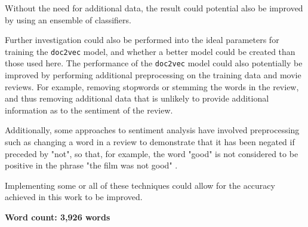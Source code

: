 \documentclass[twocolumn]{article}
\begin{document}
Without the need for additional data, the result could potential also be improved by using an ensemble of classifiers.

Further investigation could also be performed into the ideal parameters for training the \texttt{doc2vec} model, and whether a better model could be created than those used here. The performance of the \texttt{doc2vec} model could also potentially be improved by performing additional preprocessing on the training data and movie reviews. For example, removing stopwords or stemming the words in the review, and thus removing additional data that is unlikely to provide additional information as to the sentiment of the review.

Additionally, some approaches to sentiment analysis have involved preprocessing such as changing a word in a review to demonstrate that it has been negated if preceded by "not", so that, for example, the word "good" is not considered to be positive in the phrase "the film was not good" \cite{pang}.

Implementing some or all of these techniques could allow for the accuracy achieved in this work to be improved.


\textbf{Word count: 3,926 words}

{}

\end{document}
